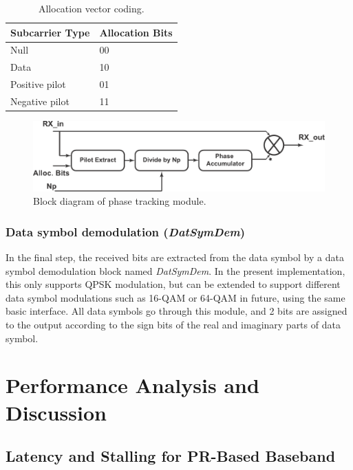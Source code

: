 \begin{table}[h]
\centering
\caption{Allocation vector coding.}{
\label{tab:alloc_vec}
\renewcommand{\arraystretch}{1.3}
\begin{tabular}{@{}ll@{}}
\toprule
Subcarrier Type		&  Allocation Bits 	\\ \midrule
Null					&  00				\\
Data				&  10				\\
Positive pilot			&  01				\\
Negative pilot		&  11				\\
\end{tabular}
}
\end{table}
\begin{figure}
\centering
\includegraphics [width=0.7\columnwidth]{Figures/MSCR_RX_Phase.pdf}
\caption{Block diagram of phase tracking module.}
\label{fig:Phase}
\end{figure}

\subsubsection{Data symbol demodulation (\emph{DatSymDem})}
In the final step, the received bits are extracted from the data symbol by a data symbol demodulation block named \emph{DatSymDem}.
In the present implementation, this only supports QPSK modulation, but can be extended to support different data symbol modulations such as 16-QAM or 64-QAM in future, using the same basic interface.
All data symbols go through this module, and 2 bits are assigned to the output according to the sign bits of the real and imaginary parts of data symbol.


\section{Performance Analysis and Discussion}
\label{sec:PerAna}
\subsection{Latency and Stalling for PR-Based Baseband}

